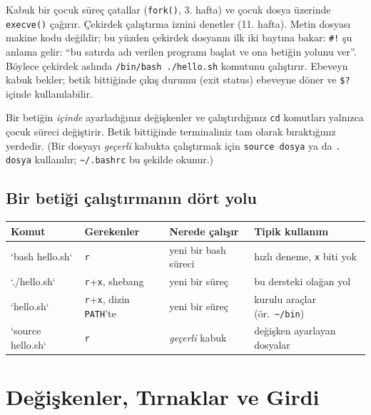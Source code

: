 \documentclass[11pt,a4paper]{article}
\newcommand{\cmd}[1]{\texttt{#1}}
\begin{document}
Kabuk bir çocuk süreç çatallar (\cmd{fork()}, 3. hafta) ve çocuk dosya üzerinde \cmd{execve()} çağırır. Çekirdek çalıştırma iznini denetler (11. hafta). Metin dosyası makine kodu değildir; bu yüzden çekirdek dosyanın ilk iki baytına bakar: \texttt{\#!} şu anlama gelir: “bu satırda adı verilen programı başlat ve ona betiğin yolunu ver”. Böylece çekirdek aslında \texttt{/bin/bash ./hello.sh} komutunu çalıştırır. Ebeveyn kabuk bekler; betik bittiğinde çıkış durumu (exit status) ebeveyne döner ve \texttt{\$?} içinde kullanılabilir.

\begin{keyidea}
Bir betiğin \emph{içinde} ayarladığınız değişkenler ve çalıştırdığınız \cmd{cd} komutları yalnızca çocuk süreci değiştirir. Betik bittiğinde terminaliniz tam olarak bıraktığınız yerdedir. (Bir dosyayı \emph{geçerli} kabukta çalıştırmak için \cmd{source dosya} ya da \cmd{. dosya} kullanılır; \texttt{\textasciitilde/.bashrc} bu şekilde okunur.)
\end{keyidea}

\subsection{Bir betiği çalıştırmanın dört yolu}

\begin{center}
\small
\begin{tabular}{@{}llll@{}}
\toprule
\textbf{Komut} & \textbf{Gerekenler} & \textbf{Nerede çalışır} & \textbf{Tipik kullanım}\\
\midrule
`bash hello.sh` & \texttt{r} & yeni bir bash süreci & hızlı deneme, \texttt{x} biti yok\\
`./hello.sh` & \texttt{r}+\texttt{x}, shebang & yeni bir süreç & bu dersteki olağan yol\\
`hello.sh` & \texttt{r}+\texttt{x}, dizin \texttt{PATH}'te & yeni bir süreç & kurulu araçlar (ör.\ \texttt{\textasciitilde/bin})\\
`source hello.sh` & \texttt{r} & \emph{geçerli} kabuk & değişken ayarlayan dosyalar\\
\bottomrule
\end{tabular}
\end{center}

\section{Değişkenler, Tırnaklar ve Girdi}
\end{document}

